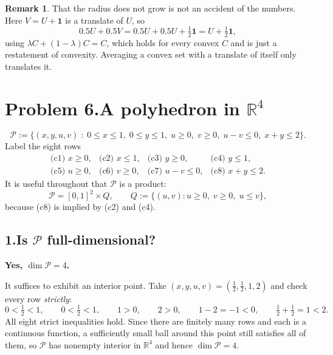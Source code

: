 \documentclass[11pt]{article}
\DeclareMathOperator{\dimop}{dim}
\theoremstyle{definition}
\newtheorem{remark}{Remark}
\theoremstyle{plain}
\begin{document}
\begin{remark}
That the radius does not grow is not an accident of the numbers. Here
$V = U + \mathbf{1}$ is a translate of $U$, so
\[
  0.5U + 0.5V = 0.5U + 0.5U + \tfrac12 \mathbf{1}
              = U + \tfrac12 \mathbf{1},
\]
using $\lambda C + (1-\lambda)C = C$, which holds for every convex $C$
and is just a restatement of convexity. Averaging a convex set with a
translate of itself only translates it.
\end{remark}

\section*{Problem 6.\quad A polyhedron in $\mathbb{R}^4$ \quad[20 pts]}

\[
  \mathcal{P} := \big\{ (x,y,u,v) \;:\;
    0 \le x \le 1,\; 0 \le y \le 1,\;
    u \ge 0,\; v \ge 0,\; u - v \le 0,\; x + y \le 2 \big\}.
\]
Label the eight rows
\[
  \begin{array}{llll}
  \text{(c1) } x \ge 0, &
  \text{(c2) } x \le 1, &
  \text{(c3) } y \ge 0, &
  \text{(c4) } y \le 1, \\[2pt]
  \text{(c5) } u \ge 0, &
  \text{(c6) } v \ge 0, &
  \text{(c7) } u - v \le 0, &
  \text{(c8) } x + y \le 2 .
  \end{array}
\]
It is useful throughout that $\mathcal{P}$ is a product:
\[
  \mathcal{P} = [0,1]^2 \times Q,
  \qquad
  Q := \{ (u,v) : u \ge 0,\; v \ge 0,\; u \le v \},
\]
because (c8) is implied by (c2) and (c4).

\subsection*{1.\quad Is $\mathcal{P}$ full-dimensional?}

\textbf{Yes, $\dimop \mathcal{P} = 4$.}

It suffices to exhibit an interior point. Take
$(x,y,u,v) = (\tfrac12, \tfrac12, 1, 2)$ and check every row
\emph{strictly}:
\[
  0 < \tfrac12 < 1, \qquad 0 < \tfrac12 < 1, \qquad
  1 > 0, \qquad 2 > 0, \qquad 1 - 2 = -1 < 0, \qquad
  \tfrac12 + \tfrac12 = 1 < 2 .
\]
All eight strict inequalities hold. Since there are finitely many rows
and each is a continuous function, a sufficiently small ball around this
point still satisfies all of them, so $\mathcal{P}$ has nonempty
interior in $\mathbb{R}^4$ and hence $\dimop \mathcal{P} = 4$.
\end{document}
